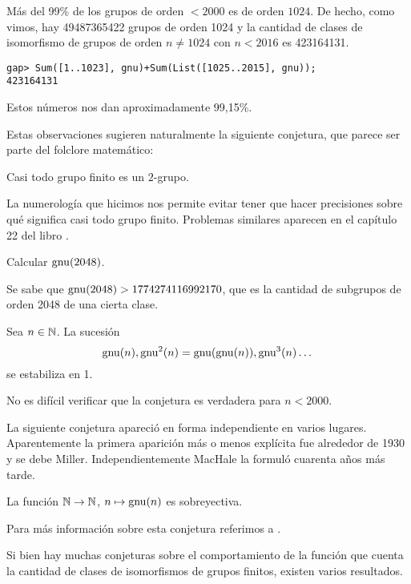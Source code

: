Más del 99\% de los grupos de orden $<2000$ es de orden $1024$. 
De hecho, como vimos, hay 49487365422 grupos de orden 1024 y la cantidad de clases de isomorfismo 
de grupos de orden $n\ne1024$ con $n<2016$ es 423164131. 

\begin{lstlisting}
gap> Sum([1..1023], gnu)+Sum(List([1025..2015], gnu));
423164131
\end{lstlisting}

Estos números nos dan aproximadamente 99,15\%. 

Estas observaciones sugieren naturalmente la siguiente conjetura,
que parece ser parte del folclore matemático:

\begin{conjecture}
Casi todo grupo finito es un $2$-grupo. 
\end{conjecture}

La numerología que hicimos nos permite evitar tener que hacer precisiones sobre 
qué significa \guillemotleft casi todo grupo finito\guillemotright. Problemas
similares aparecen en el capítulo 22 del libro \cite{MR2382539}.

\begin{problem}
Calcular $\operatorname{gnu}(2048)$. 
\end{problem}

Se sabe que $\operatorname{gnu}(2048)>1774274116992170$, que es la cantidad de subgrupos de orden 2048 
de una cierta clase. 

\begin{conjecture}
Sea $n\in\mathbb{N}$. La sucesión
\[
\operatorname{gnu}(n),\operatorname{gnu}^2(n)=\operatorname{gnu}(\operatorname{gnu}(n)),\operatorname{gnu}^3(n)\dots
\]
se estabiliza en 1. 
\end{conjecture}

No es difícil verificar que la conjetura es verdadera para $n<2000$.

La siguiente conjetura apareció en forma independiente en varios lugares. 
Aparentemente la primera aparición más o menos explícita 
fue alrededor de 1930 y se debe Miller. 
Independientemente MacHale la formuló cuarenta años más tarde. 

\begin{conjecture}
La función $\mathbb{N}\to\mathbb{N}$, $n\mapsto\operatorname{gnu}(n)$ es sobreyectiva. 
\end{conjecture}

Para más información sobre esta conjetura referimos a \cite[\S21.6]{MR2382539}.

Si bien hay muchas conjeturas sobre el comportamiento de la función que cuenta la cantidad de 
clases de isomorfismos de grupos finitos, existen varios 
resultados. 

